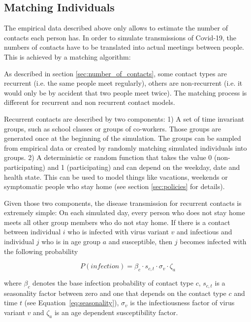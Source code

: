 \subsection{Matching Individuals}
\label{sec:matching}

The empirical data described above only allows to estimate the number of contacts each
person has. In order to simulate transmissions of Covid-19, the numbers of contacts have
to be translated into actual meetings between people. This is achieved by a matching
algorithm:

As described in section \ref{sec:number_of_contacts}, some contact types are recurrent
(i.e. the same people meet regularly), others are non-recurrent (i.e. it would only be
by accident that two people meet twice). The matching process is different for recurrent
and non recurrent contact models.

Recurrent contacts are described by two components: 1) A set of time invariant groups,
such as school classes or groups of co-workers. Those groups are generated once at the
beginning of the simulation. The groups can be sampled from empirical data or created by
randomly matching simulated individuals into groups. 2) A deterministic or random
function that takes the value 0 (non-participating) and 1 (participating) and can depend
on the weekday, date and health state. This can be used to model things like vacations,
weekends or symptomatic people who stay home (see section \ref{sec:policies} for
details).

Given those two components, the disease transmission for recurrent contacts is extremely
simple: On each simulated day, every person who does not stay home meets all other group
members who do not stay home. If there is a contact between individual $i$ who is
infected with virus variant $v$ and infectious and individual $j$ who is in age group
$a$ and susceptible, then $j$ becomes infected with the following probability

\begin{equation}
    \label{eq:infection_probability_formula}
    P(infection) = \beta_c \cdot s_{c, t} \cdot \sigma_v \cdot \zeta_a
\end{equation}

where $\beta_c$ denotes the base infection probability of contact type $c$,
$s_{c, t}$ is a seasonality factor between zero and one that depends on the contact
type $c$ and time $t$ (see Equation~\ref{eq:seasonality}), $\sigma_v$ is the
infectiousness factor of virus variant $v$ and $\zeta_a$ is an age dependent
susceptibility factor.

